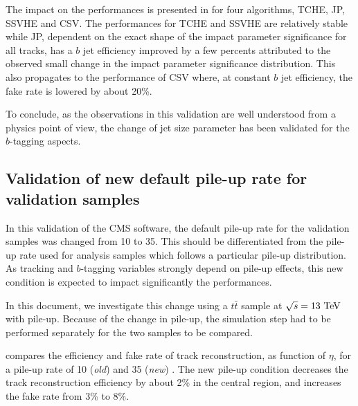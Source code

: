     The impact on the performances is presented in
     for four
    algorithms, TCHE, JP, SSVHE and CSV. The performances for TCHE and SSVHE are
    relatively stable while JP, dependent on the exact shape of the impact
    parameter significance for all tracks, has a $b$ jet efficiency improved by
    a few percents attributed to the observed small change in the impact
    parameter significance distribution. This also propagates to the performance
    of CSV where, at constant $b$ jet efficiency, the fake rate is lowered by
    about 20\%.

    To conclude, as the observations in this validation are well understood from
    a physics point of view, the change of jet size parameter has been validated
    for the $b$-tagging aspects.

    \subsection{Validation of new default pile-up rate for validation samples}

    In this validation of the CMS software, the default pile-up rate for the
    validation samples was changed from 10 to 35. This should be differentiated
    from the pile-up rate used for analysis samples which follows a particular
    pile-up distribution.  As tracking and $b$-tagging variables strongly depend
    on pile-up effects, this new condition is expected to impact significantly
    the performances.

    In this document, we investigate this change using a $t\bar{t}$ sample at
    $\sqrt{s} = 13~\text{TeV}$ with pile-up. Because of the change in pile-up, the
    simulation step had to be performed separately for the two samples to be
    compared.

     compares the efficiency and fake rate
    of track reconstruction, as function of $\eta$, for a pile-up rate of 10
    (\emph{old}) and 35 (\emph{new}) \cite{TrackingNewPUComparison}. The new
    pile-up condition decreases the track reconstruction efficiency by about 2\%
    in the central region, and increases the fake rate from 3\% to 8\%.


